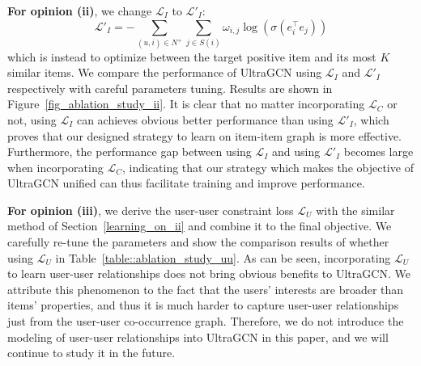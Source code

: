 \documentclass[sigconf,authorversion]{acmart}
\begin{document}
\begin{table}[!t]
\centering
\caption{Performance comparison of whether learning on the user-user co-occurrence graph.}
\label{table::ablation_study_uu}
\end{table}


\textbf{For opinion (ii)}, we change $\mathcal{L}_I$ to $\mathcal{L'}_{I}$:
\begin{equation}
	\mathcal{L'}_{I} = -\sum_{(u,i)\in N^+}\sum_{j \in S(i)} \omega_{i, j} \log(\sigma(e_{i}^{\top} e_{j}))
\end{equation}
which is instead to optimize between the target positive item and its most $K$ similar items. We compare the performance of UltraGCN using $\mathcal{L}_I$ and $\mathcal{L'}_I$ respectively with careful parameters tuning. Results are shown in Figure~\ref{fig_ablation_study_ii}. It is clear that no matter incorporating $\mathcal{L}_C$ or not, using $\mathcal{L}_I$ can achieves obvious better performance than using $\mathcal{L'}_I$, which proves that our designed strategy to learn on item-item graph is more effective. Furthermore, the performance gap between using $\mathcal{L}_I$ and using $\mathcal{L'}_I$ becomes large when incorporating $\mathcal{L}_C$, indicating that our strategy which makes the objective of UltraGCN unified can thus facilitate training and improve performance. 

\textbf{For opinion (iii)}, we derive the user-user constraint loss $\mathcal{L}_U$ with the similar method of Section~\ref{learning_on_ii} and combine it to the final objective. We carefully re-tune the parameters and show the comparison results of whether using $\mathcal{L}_U$ in Table~\ref{table::ablation_study_uu}. 
As can be seen, incorporating $\mathcal{L}_U$ to learn user-user relationships does not bring obvious benefits to UltraGCN. We attribute this phenomenon to the fact that the users' interests are broader than items' properties, and thus it is much harder to capture user-user relationships just from the user-user co-occurrence graph. Therefore, we do not introduce the modeling of user-user relationships into UltraGCN in this paper, and we will continue to study it in the future.
\end{document}
